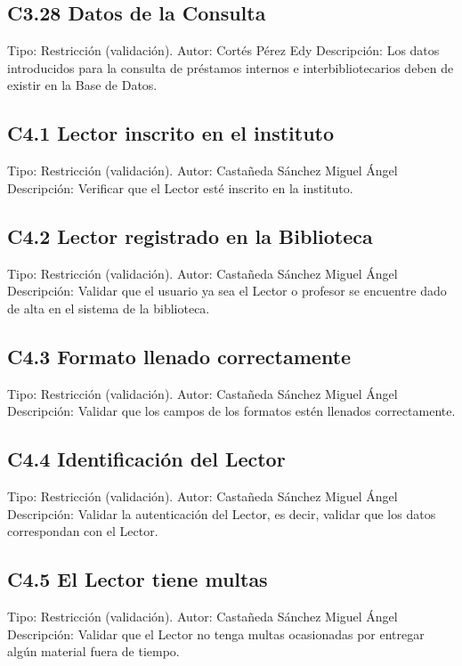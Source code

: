 \subsection{C3.28 Datos de la Consulta}
	\UCli Tipo: Restricción (validación).
	\UCli Autor: Cortés Pérez Edy
	\UCli Descripción: Los datos introducidos para la consulta de préstamos internos e interbibliotecarios deben de existir en la Base de Datos.

  \subsection{C4.1 Lector inscrito en el instituto}
	\UCli Tipo: Restricción (validación).
	\UCli Autor: Castañeda Sánchez Miguel Ángel
	\UCli Descripción: Verificar que el Lector esté inscrito en la instituto.

 \subsection{C4.2 Lector  registrado en la Biblioteca}
	\UCli Tipo: Restricción (validación).
	\UCli Autor: Castañeda Sánchez Miguel Ángel
	\UCli Descripción: Validar que el usuario ya sea el Lector o profesor se encuentre dado de alta en el sistema de la biblioteca.


 \subsection{C4.3 Formato llenado correctamente}
	\UCli Tipo: Restricción (validación).
	\UCli Autor: Castañeda Sánchez Miguel Ángel
	\UCli Descripción: Validar que los campos de los formatos estén llenados correctamente.

 \subsection{C4.4 Identificación del Lector}
	\UCli Tipo: Restricción (validación).
	\UCli Autor: Castañeda Sánchez Miguel Ángel
	\UCli Descripción: Validar la autenticación del Lector, es decir, validar que los datos correspondan con el Lector.

 \subsection{C4.5 El Lector tiene multas}
	\UCli Tipo: Restricción (validación).
	\UCli Autor: Castañeda Sánchez Miguel Ángel
	\UCli Descripción: Validar que el Lector no tenga multas ocasionadas por entregar algún material fuera de tiempo.

